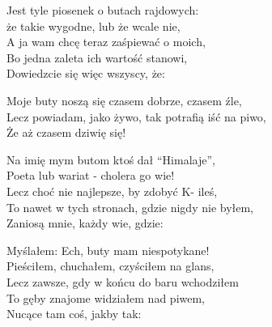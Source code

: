 \begin{text}
    Jest tyle piosenek o butach rajdowych:\\
    że takie wygodne, lub że wcale nie,\\
    A ja wam chcę teraz zaśpiewać o moich,\\
    Bo jedna zaleta ich wartość stanowi,\\
    Dowiedzcie się więc wszyscy, że:

    \vin Moje buty noszą się czasem dobrze, czasem źle,\\
    \vin Lecz powiadam, jako żywo, tak potrafią iść na piwo,\\
    \vin Że aż czasem dziwię się!

    Na imię mym butom ktoś dał “Himalaje”,\\
    Poeta lub wariat - cholera go wie!\\
    Lecz choć nie najlepsze, by zdobyć K- ileś,\\
    To nawet w tych stronach, gdzie nigdy nie byłem,\\
    Zaniosą mnie, każdy wie, gdzie:

    Myślałem: Ech, buty mam niespotykane!\\
    Pieściłem, chuchałem, czyściłem na glans,\\
    Lecz zawsze, gdy w końcu do baru wchodziłem\\
    To gęby znajome widziałem nad piwem,\\
    Nucące tam coś, jakby tak:
\end{text}
\begin{chord}

\end{chord}